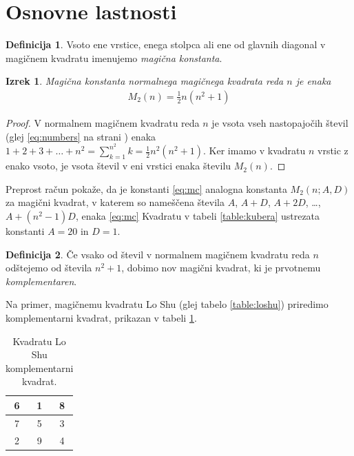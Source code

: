 \documentclass[a4paper,12pt]{article}
\newtheorem{izrek}{Izrek}
\theoremstyle{definition}
\newtheorem{definicija}{Definicija}
\newenvironment{magic}[3]{
    \begin{table}[h]
        \centering
        \caption{#1}
        \label{#3}
        \large
        \begin{tabular}{|*{#2}{c|}}
            \hline
            }
            {
        \end{tabular}
        \normalsize
    \end{table}
}
\newcommand\m{M_2}
\newcommand{\pojem}[1]{\emph{\color{purple}#1}}
\begin{document}
\section{Osnovne lastnosti}

\begin{definicija}
      Vsoto ene vrstice, enega stolpca ali ene od glavnih diagonal
      v magičnem kvadratu imenujemo \pojem{magična konstanta}.
\end{definicija}

\begin{izrek}
   Magična konstanta normalnega magičnega kvadrata reda $n$ je enaka
   \begin{align}
       \m(n) = \frac{1}{2} n(n^2+1) \label{eq:mc}
   \end{align}
\end{izrek}

\begin{proof}
   V normalnem magičnem kvadratu reda $n$ je vsota vseh nastopajočih
    števil (glej \eqref{eq:numbers} na strani \pageref{eq:numbers}) enaka
   $1+2+3+\dots+n^2=\sum_{k=1}^{n^2}k=\frac{1}{2}n^2(n^2+1)$. Ker imamo
   v kvadratu $n$ vrstic z enako vsoto, je vsota števil v eni vrstici
   enaka številu $\m(n)$. %
\end{proof}

Preprost račun pokaže, da je konstanti \eqref{eq:mc} analogna konstanta
$\m(n;A,D)$ za magični kvadrat, v katerem so nameščena števila
$A$, $A+D$, $A+2D$, \dots, $A+(n^2-1)D$, enaka %
\ref{eq:mc}
Kvadratu v tabeli \ref{table:kubera} ustrezata konstanti $A=20$ in $D=1$.

\begin{definicija}
      Če vsako od števil v normalnem magičnem kvadratu reda $n$ odštejemo
      od števila $n^2+1$, dobimo nov magični kvadrat, ki je prvotnemu
      \pojem{komplementaren}.
\end{definicija}

Na primer, magičnemu kvadratu Lo Shu (glej tabelo \ref{table:loshu}) priredimo
komplementarni kvadrat, prikazan v tabeli \ref{table:closhu}.

\begin{magic}{Kvadratu Lo Shu komplementarni kvadrat.}{3}{table:closhu}
        6 & 1 & 8 \\\hline
        7 & 5 & 3 \\\hline
        2 & 9 & 4 \\\hline
\end{magic}
\end{document}
